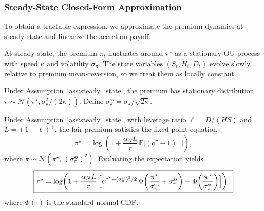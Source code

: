 \subsubsection{Steady-State Closed-Form Approximation}
\label{sec:steady_state}

To obtain a tractable expression, we approximate the premium dynamics at
steady state and linearize the accretion payoff.

\begin{assumption}
  \label{ass:steady_state}
  At steady state, the premium $\pi_t$ fluctuates around $\pi^\star$ as a
  stationary OU process with speed $\kappa$ and volatility $\sigma_\pi$.
  The state variables $(S_t, H_t, D_t)$ evolve slowly relative to premium
  mean-reversion, so we treat them as locally constant.
\end{assumption}

Under Assumption~\ref{ass:steady_state}, the premium has stationary
distribution $\pi \sim \mathcal{N}(\pi^\star, \sigma_\pi^2/(2\kappa))$.
Define $\sigma_\pi^{\mathrm{ss}} = \sigma_\pi / \sqrt{2\kappa}$.

\begin{proposition}
  \label{prop:steady_state}
  Under Assumption~\ref{ass:steady_state}, with leverage ratio
  $\ell = D/(HS)$ and $L = (1-\ell)^+$, the fair premium satisfies the
  fixed-point equation
  \begin{equation}
    \label{eq:pi_star_fp}
    \pi^\star
    = \log\!\left(
        1 + \frac{\alpha_N L}{r}\,
        \mathbb{E}\bigl[(e^{\pi} - 1)^+\bigr]
      \right),
  \end{equation}
  where $\pi \sim \mathcal{N}(\pi^\star,\, (\sigma_\pi^{\mathrm{ss}})^2)$.
  Evaluating the expectation yields
  \begin{equation}
    \label{eq:pi_star_closed}
    \boxed{
      \pi^\star
      = \log\!\left(
          1 + \frac{\alpha_N L}{r}\,\Bigl[
            e^{\pi^\star + (\sigma_\pi^{\mathrm{ss}})^2/2}\,
            \Phi\!\left(\frac{\pi^\star}{\sigma_\pi^{\mathrm{ss}}}
              + \sigma_\pi^{\mathrm{ss}}\right)
            - \Phi\!\left(\frac{\pi^\star}{\sigma_\pi^{\mathrm{ss}}}\right)
          \Bigr]
        \right),
    }
  \end{equation}
  where $\Phi(\cdot)$ is the standard normal CDF.
\end{proposition}

